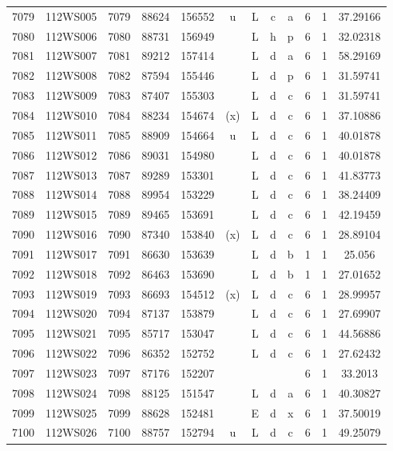 \begin{tabular}{|*{12}{c|}}
7079 & 112WS005 & 7079 & 88624 & 156552 & u & L & c & a & 6 & 1 & 37.29166 \\ 
7080 & 112WS006 & 7080 & 88731 & 156949 &  & L & h & p & 6 & 1 & 32.02318 \\ 
7081 & 112WS007 & 7081 & 89212 & 157414 &  & L & d & a & 6 & 1 & 58.29169 \\ 
7082 & 112WS008 & 7082 & 87594 & 155446 &  & L & d & p & 6 & 1 & 31.59741 \\ 
7083 & 112WS009 & 7083 & 87407 & 155303 &  & L & d & c & 6 & 1 & 31.59741 \\ 
7084 & 112WS010 & 7084 & 88234 & 154674 & (x) & L & d & c & 6 & 1 & 37.10886 \\ 
7085 & 112WS011 & 7085 & 88909 & 154664 & u & L & d & c & 6 & 1 & 40.01878 \\ 
7086 & 112WS012 & 7086 & 89031 & 154980 &  & L & d & c & 6 & 1 & 40.01878 \\ 
7087 & 112WS013 & 7087 & 89289 & 153301 &  & L & d & c & 6 & 1 & 41.83773 \\ 
7088 & 112WS014 & 7088 & 89954 & 153229 &  & L & d & c & 6 & 1 & 38.24409 \\ 
7089 & 112WS015 & 7089 & 89465 & 153691 &  & L & d & c & 6 & 1 & 42.19459 \\ 
7090 & 112WS016 & 7090 & 87340 & 153840 & (x) & L & d & c & 6 & 1 & 28.89104 \\ 
7091 & 112WS017 & 7091 & 86630 & 153639 &  & L & d & b & 1 & 1 & 25.056 \\ 
7092 & 112WS018 & 7092 & 86463 & 153690 &  & L & d & b & 1 & 1 & 27.01652 \\ 
7093 & 112WS019 & 7093 & 86693 & 154512 & (x) & L & d & c & 6 & 1 & 28.99957 \\ 
7094 & 112WS020 & 7094 & 87137 & 153879 &  & L & d & c & 6 & 1 & 27.69907 \\ 
7095 & 112WS021 & 7095 & 85717 & 153047 &  & L & d & c & 6 & 1 & 44.56886 \\ 
7096 & 112WS022 & 7096 & 86352 & 152752 &  & L & d & c & 6 & 1 & 27.62432 \\ 
7097 & 112WS023 & 7097 & 87176 & 152207 &  &  &  &  & 6 & 1 & 33.2013 \\ 
7098 & 112WS024 & 7098 & 88125 & 151547 &  & L & d & a & 6 & 1 & 40.30827 \\ 
7099 & 112WS025 & 7099 & 88628 & 152481 &  & E & d & x & 6 & 1 & 37.50019 \\ 
7100 & 112WS026 & 7100 & 88757 & 152794 & u & L & d & c & 6 & 1 & 49.25079 \\ 

\end{tabular}
